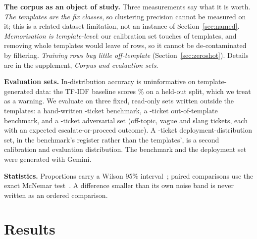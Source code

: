 \documentclass[conference,a4paper]{IEEEtran}
\begin{document}
\textbf{The corpus as an object of study.} Three measurements say what it is worth. \emph{The templates are the fix classes}, so clustering precision cannot be measured on it; this is a related dataset limitation, not an instance of Section~\ref{sec:named}. \emph{Memorisation is template-level}: our calibration set touches  of  templates, and removing whole templates would leave  of  rows, so it cannot be de-contaminated by filtering. \emph{Training rows buy little off-template} (Section~\ref{sec:zeroshot}). Details are in the supplement, \emph{Corpus and evaluation sets}.

\textbf{Evaluation sets.} In-distribution accuracy is uninformative on template-generated data: the TF-IDF baseline scores \% on a held-out split, which we treat as a warning. We evaluate on three fixed, read-only sets written outside the templates: a hand-written -ticket benchmark, a -ticket out-of-template benchmark, and a -ticket adversarial set (off-topic, vague and slang tickets, each with an expected escalate-or-proceed outcome). A -ticket deployment-distribution set, in the benchmark's register rather than the templates', is a second calibration and evaluation distribution. The benchmark and the deployment set were generated with Gemini.

\textbf{Statistics.} Proportions carry a Wilson 95\% interval~\cite{wilson}; paired comparisons use the exact McNemar test~\cite{mcnemar}. A difference smaller than its own noise band is never written as an ordered comparison.

\section{Results}
\label{sec:results}
\end{document}

